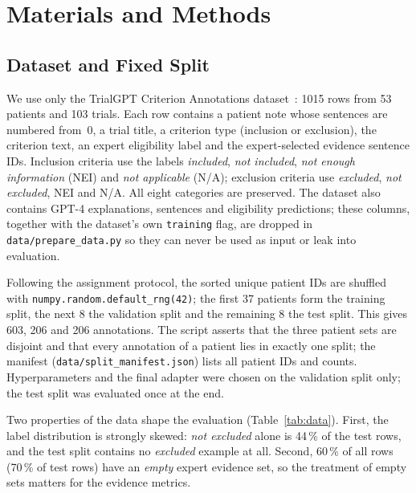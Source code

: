 \section{Materials and Methods}
\label{sec:methods}

\subsection{Dataset and Fixed Split}
We use only the TrialGPT Criterion Annotations dataset~\cite{ncbi2024trialgptdata}: 1015 rows from 53 patients and 103 trials. Each row contains a patient note whose sentences are numbered from~0, a trial title, a criterion type (inclusion or exclusion), the criterion text, an expert eligibility label and the expert-selected evidence sentence IDs. Inclusion criteria use the labels \emph{included}, \emph{not included}, \emph{not enough information} (NEI) and \emph{not applicable} (N/A); exclusion criteria use \emph{excluded}, \emph{not excluded}, NEI and N/A. All eight categories are preserved. The dataset also contains GPT-4 explanations, sentences and eligibility predictions; these columns, together with the dataset's own \texttt{training} flag, are dropped in \texttt{data/prepare\_data.py} so they can never be used as input or leak into evaluation.

Following the assignment protocol, the sorted unique patient IDs are shuffled with \texttt{numpy.random.default\_rng(42)}; the first 37 patients form the training split, the next 8 the validation split and the remaining 8 the test split. This gives 603, 206 and 206 annotations. The script asserts that the three patient sets are disjoint and that every annotation of a patient lies in exactly one split; the manifest (\texttt{data/split\_manifest.json}) lists all patient IDs and counts. Hyperparameters and the final adapter were chosen on the validation split only; the test split was evaluated once at the end.

Two properties of the data shape the evaluation (Table~\ref{tab:data}). First, the label distribution is strongly skewed: \emph{not excluded} alone is 44\,\% of the test rows, and the test split contains no \emph{excluded} example at all. Second, 60\,\% of all rows (70\,\% of test rows) have an \emph{empty} expert evidence set, so the treatment of empty sets matters for the evidence metrics.

